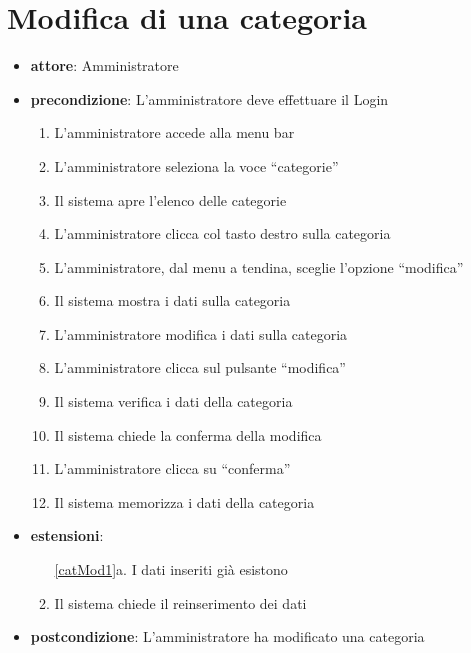 \section{Modifica di una categoria}
\begin{itemize}
	\item \textbf{attore}: Amministratore
	\item \textbf{precondizione}: L’amministratore deve effettuare il Login
	
	\begin{enumerate}
		\item L’amministratore accede alla menu bar
		\item L’amministratore seleziona la voce “categorie”
		\item Il sistema apre l’elenco delle categorie
		\item L’amministratore clicca col tasto destro sulla categoria
		\item L’amministratore, dal menu a tendina, sceglie l’opzione “modifica”
		\item Il sistema mostra i dati sulla categoria
		\item L’amministratore modifica i dati sulla categoria
		\item L’amministratore clicca sul pulsante “modifica”
		\label{catMod1}
		\item Il sistema verifica i dati della categoria
		\item Il sistema chiede la conferma della modifica
		\item L’amministratore clicca su “conferma”
		\item Il sistema memorizza i dati della categoria
	\end{enumerate}

	\item \textbf{estensioni}:
	\begin{enumerate}
		\item[\ref{catMod1}a.] I dati inseriti già esistono
		\item Il sistema chiede il reinserimento dei dati
	\end{enumerate}

	\item \textbf{postcondizione}: L’amministratore ha modificato una categoria
\end{itemize}


